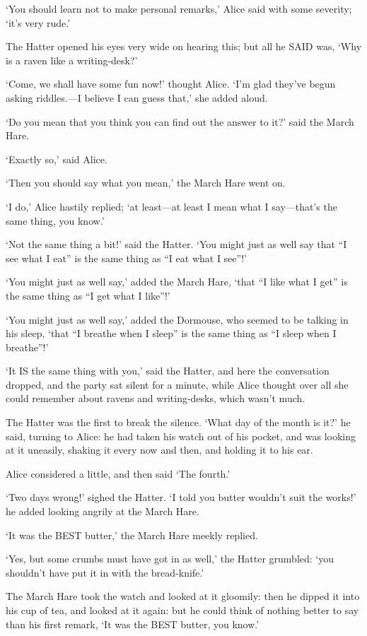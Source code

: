 \documentclass[12pt]{article}
\begin{document}
\begin{Parallel}[p]{}{}
{‘You should learn not to make personal remarks,’ Alice said with some severity; ‘it’s very rude.’

The Hatter opened his eyes very wide on hearing this; but all he SAID was, ‘Why is a raven like a writing-desk?’

‘Come, we shall have some fun now!’ thought Alice. ‘I’m glad they’ve begun asking riddles.—I believe I can guess that,’ she added aloud.

‘Do you mean that you think you can find out the answer to it?’ said the March Hare.

‘Exactly so,’ said Alice.

‘Then you should say what you mean,’ the March Hare went on.

‘I do,’ Alice hastily replied; ‘at least—at least I mean what I say—that’s the same thing, you know.’

‘Not the same thing a bit!’ said the Hatter. ‘You might just as well say that “I see what I eat” is the same thing as “I eat what I see”!’

‘You might just as well say,’ added the March Hare, ‘that “I like what I get” is the same thing as “I get what I like”!’

‘You might just as well say,’ added the Dormouse, who seemed to be talking in his sleep, ‘that “I breathe when I sleep” is the same thing as “I sleep when I breathe”!’

‘It IS the same thing with you,’ said the Hatter, and here the conversation dropped, and the party sat silent for a minute, while Alice thought over all she could remember about ravens and writing-desks, which wasn’t much.

The Hatter was the first to break the silence. ‘What day of the month is it?’ he said, turning to Alice: he had taken his watch out of his pocket, and was looking at it uneasily, shaking it every now and then, and holding it to his ear.

Alice considered a little, and then said ‘The fourth.’

‘Two days wrong!’ sighed the Hatter. ‘I told you butter wouldn’t suit the works!’ he added looking angrily at the March Hare.

‘It was the BEST butter,’ the March Hare meekly replied.

‘Yes, but some crumbs must have got in as well,’ the Hatter grumbled: ‘you shouldn’t have put it in with the bread-knife.’

The March Hare took the watch and looked at it gloomily: then he dipped it into his cup of tea, and looked at it again: but he could think of nothing better to say than his first remark, ‘It was the BEST butter, you know.’

}
\end{Parallel}
\end{document}
